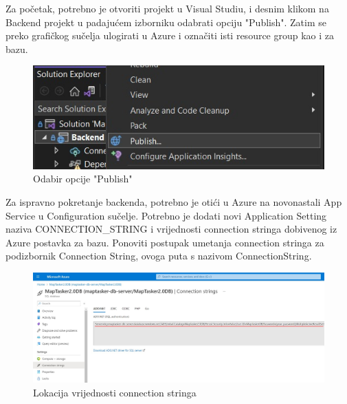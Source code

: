 			\noindent Za početak, potrebno je otvoriti projekt u Visual Studiu, i desnim klikom na Backend projekt u padajućem izborniku odabrati opciju "Publish". Zatim se preko grafičkog sučelja ulogirati u Azure i označiti isti resource group kao i za bazu.
	
			\vspace{10mm}
	
			\begin{figure}[H]
				 \includegraphics[width=\linewidth]{./slike/backend1.jpg}
				  \centering
				  \caption{Odabir opcije "Publish"}
			  \end{figure}
			  
			\vspace{10mm}
	
			\noindent Za ispravno pokretanje backenda, potrebno je otići u Azure na novonastali App Service u Configuration sučelje. Potrebno je dodati novi Application Setting naziva CONNECTION\_STRING i vrijednosti connection stringa dobivenog iz Azure postavka za bazu. Ponoviti postupak umetanja connection stringa za podizbornik Connection String, ovoga puta s nazivom ConnectionString. 
	
			\vspace{10mm}
	
			\begin{figure}[H]
				 \includegraphics[width=\linewidth]{./slike/backend1a.jpg}
				  \centering
				  \caption{Lokacija vrijednosti connection stringa}
			  \end{figure}
			  
			\vspace{20mm}
	
